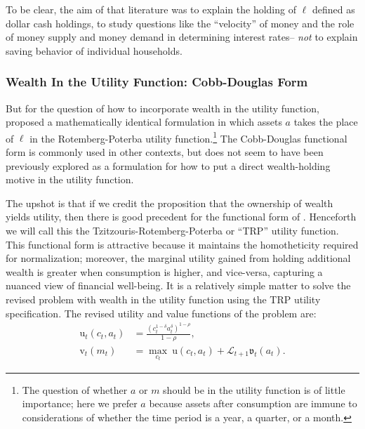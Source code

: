 \documentclass[12pt,letterpaper, fleqn]{article}
\newcommand{\CRRA}{\rho}
\newcommand{\uFunc}{\mathrm{u}}
\newcommand{\vFunc}{\mathrm{v}}
\newcommand{\Alive}{\mathcal{L}}
\newcommand{\cNrm}{c}
\newcommand{\mNrm}{m}
\newcommand{\aNrm}{a}
\newcommand{\lqdt}{\ell}
\begin{document}
To be clear, the aim of that literature was to explain the holding of $\lqdt$ defined as dollar cash holdings, to study questions like the ``velocity'' of money and the role of money supply and money demand in determining interest rates-- \textit{not} to explain saving behavior of individual households.

\subsubsection{Wealth In the Utility Function: Cobb-Douglas Form}

But for the question of how to incorporate wealth in the utility function, \cite{Tzitzouris2024} proposed a mathematically identical formulation in which assets $\aNrm$ takes the place of $\lqdt$ in the Rotemberg-Poterba utility function.\footnote{The question of whether $\aNrm$ or $\mNrm$ should be in the utility function is of little importance; here we prefer $\aNrm$ because assets after consumption are immune to considerations of whether the time period is a year, a quarter, or a month.}
The Cobb-Douglas functional form is commonly used in other contexts, but does not seem to have been previously explored as a formulation for how to put a direct wealth-holding motive in the utility function.


The upshot is that if we credit the proposition that the ownership of wealth yields utility, then there is good precedent for the functional form of \cite{Tzitzouris2024}.
Henceforth we will call this the Tzitzouris-Rotemberg-Poterba or ``TRP'' utility function. This functional form is attractive because it maintains the homotheticity required for normalization; moreover, the marginal utility gained from holding additional wealth is greater when consumption is higher, and vice-versa, capturing a nuanced view of financial well-being.
It is a relatively simple matter to solve the revised problem with wealth in the utility function using the TRP utility specification. The revised utility and value functions of the problem are:
\begin{align}
    \uFunc_t(\cNrm_t, \aNrm_t) & = \frac{\left(\cNrm_t^{1-\delta}\aNrm_t^{\delta}\right)^{1-\CRRA}}{1-\CRRA}, \\
    {\vFunc}_{t}({\mNrm}_{t}) & = \max_{\cNrm_{t}} ~ \uFunc(\cNrm_{t}, \aNrm_{t})+\Alive_{t+1}\mathfrak{v}_{t}(a_{t}).
\end{align}
\end{document}
